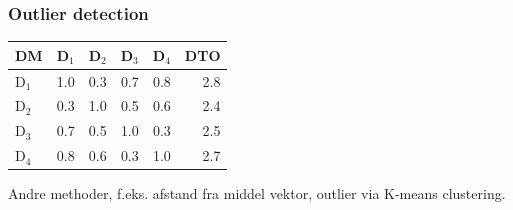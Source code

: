 \documentclass[xcolor=table]{beamer}
\begin{document}
\begin{frame}

  \frametitle{Outlier detection}

  \begin{center}
    \begin{tabular}{|l|r|r|r|r|r|}
      \hline
      DM    & D$_1$ & D$_2$ & D$_3$ & D$_4$ & DTO \\
      \hline
      D$_1$ &   1.0 &   0.3 &   0.7 &   0.8 & 2.8 \\
      \hline
      D$_2$ &   0.3 &   1.0 &   0.5 &   0.6 & 2.4 \\
      \hline
      D$_3$ &   0.7 &   0.5 &   1.0 &   0.3 & 2.5 \\
      \hline
      D$_4$ &   0.8 &   0.6 &   0.3 &   1.0 & 2.7 \\
      \hline
    \end{tabular}
  \end{center}


  Andre methoder, f.eks. afstand fra middel vektor, outlier
  via K-means clustering.

\end{frame}





\end{document}
